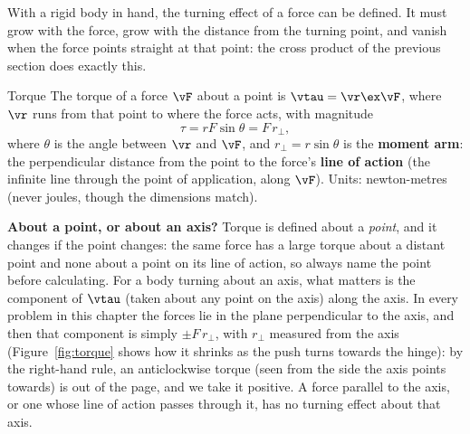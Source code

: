 With a rigid body in hand, the turning effect of a force can be defined. It must grow with the force,
grow with the distance from the turning point, and vanish when the force points straight at that point:
the cross product of the previous section does exactly this.

\begin{defbox}{Torque}
The torque of a force $\vF$ about a point is $\vtau=\vr\ex\vF$, where $\vr$ runs from that point to where the force acts, with magnitude
\[
\tau=rF\sin\theta=F\,r_\perp,
\]
where $\theta$ is the angle between $\vr$ and $\vF$, and $r_\perp=r\sin\theta$ is the \textbf{moment arm}: the perpendicular distance from the point to
the force's \textbf{line of action} (the infinite line through the point of application, along $\vF$). Units: newton-metres (never joules, though the dimensions match).
\end{defbox}

\textbf{About a point, or about an axis?} Torque is defined about a \emph{point}, and it changes if the
point changes: the same force has a large torque about a distant point and none about a point on its line
of action, so always name the point before calculating. For a body turning about an axis, what matters is
the component of $\vtau$ (taken about any point on the axis) along the axis. In every problem in this
chapter the forces lie in the plane perpendicular to the axis, and then that component is simply
$\pm F\,r_\perp$, with $r_\perp$ measured from the axis (Figure~\ref{fig:torque} shows how it shrinks as the push turns towards the hinge): by the right-hand rule, an anticlockwise torque (seen
from the side the axis points towards) is out of the page, and we take it positive. A force parallel to
the axis, or one whose line of action passes through it, has no turning effect about that axis.

\begin{figure}[htbp]
\centering
{}
\end{figure}

